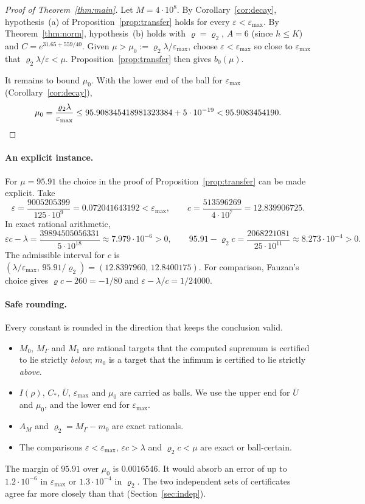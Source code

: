 \documentclass[11pt]{article}
\theoremstyle{remark}
\newcommand{\Ubar}{\overline{U}}
\newcommand{\epsmax}{\varepsilon_{\max}}
\newcommand{\Cstar}{C_{*}}
\begin{document}
\begin{proof}[Proof of Theorem~\ref{thm:main}]
Let $M=4\cdot10^8$. By Corollary~\ref{cor:decay}, hypothesis~(a) of Proposition~\ref{prop:transfer} holds for every $\varepsilon<\epsmax$. By Theorem~\ref{thm:norm}, hypothesis~(b) holds with $\varrho=\varrho_2$, $A=6$ (since $h\le K$) and $C=e^{31.65+559/40}$. Given $\mu>\mu_0:=\varrho_2\lambda/\epsmax$, choose $\varepsilon<\epsmax$ so close to $\epsmax$ that $\varrho_2\lambda/\varepsilon<\mu$. Proposition~\ref{prop:transfer} then gives $b_0(\mu)$.

It remains to bound $\mu_0$. With the lower end of the ball for $\epsmax$ (Corollary~\ref{cor:decay}),
\[
\mu_0=\frac{\varrho_2\lambda}{\epsmax}\le95.908345418981323384+5\cdot10^{-19}<95.9083454190 .\qedhere
\]
\end{proof}

\paragraph{An explicit instance.} For $\mu=95.91$ the choice in the proof of Proposition~\ref{prop:transfer} can be made explicit. Take
\[
\varepsilon=\frac{9005205399}{125\cdot10^9}=0.072041643192<\epsmax,\qquad c=\frac{513596269}{4\cdot10^7}=12.839906725 .
\]
In exact rational arithmetic,
\[
\varepsilon c-\lambda=\frac{39894505056331}{5\cdot10^{18}}\approx7.979\cdot10^{-6}>0,\qquad
95.91-\varrho_2c=\frac{2068221081}{25\cdot10^{11}}\approx8.273\cdot10^{-4}>0 .
\]
The admissible interval for $c$ is $(\lambda/\epsmax,\,95.91/\varrho_2)=(12.8397960,\,12.8400175)$. For comparison, Fauzan's choice gives $\varrho c-260=-1/80$ and $\varepsilon-\lambda/c=1/24000$.

\paragraph{Safe rounding.} Every constant is rounded in the direction that keeps the conclusion valid.
\begin{itemize}
\item $M_0$, $M_\Gamma$ and $M_1$ are rational targets that the computed supremum is certified to lie strictly \emph{below}; $m_0$ is a target that the infimum is certified to lie strictly \emph{above}.
\item $I(\rho)$, $\Cstar$, $\Ubar$, $\epsmax$ and $\mu_0$ are carried as balls. We use the upper end for $\Ubar$ and $\mu_0$, and the lower end for $\epsmax$.
\item $A_M$ and $\varrho_2=M_\Gamma-m_0$ are exact rationals.
\item The comparisons $\varepsilon<\epsmax$, $\varepsilon c>\lambda$ and $\varrho_2c<\mu$ are exact or ball-certain.
\end{itemize}
The margin of $95.91$ over $\mu_0$ is $0.0016546$. It would absorb an error of up to $1.2\cdot10^{-6}$ in $\epsmax$ or $1.3\cdot10^{-4}$ in $\varrho_2$. The two independent sets of certificates agree far more closely than that (Section~\ref{sec:indep}).
\end{document}
